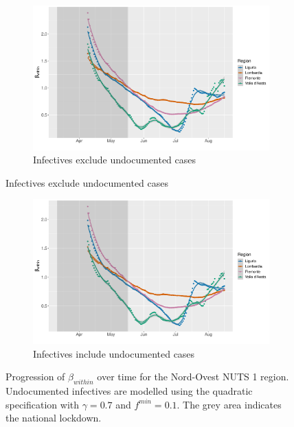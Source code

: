 \documentclass[12pt]{article}
\begin{document}
\begin{appendices}
		\begin{figure}[H]
    	    \centering
    	    \begin{subfigure}{\textwidth}
    	      \centering
    	      \includegraphics[width=0.94\linewidth]{output/model_within_lag14_betawithin_Nord-Ovest_rollingwindow30.pdf}
    	      \caption{Infectives exclude undocumented cases}
    	      \label{fig:beta_within_over_time_northwest_lowsample_regular}
    	    \end{subfigure}
        \end{figure}
        \begin{figure}[H]\ContinuedFloat
    	    \begin{subfigure}{\textwidth}
    	      \centering
    	      \includegraphics[width=0.94\linewidth]{output/model_within_lag14_betawithin_Nord-Ovest_UndocQuadratic_rollingwindow30.pdf}
    	      \caption{Infectives include undocumented cases}
    	      \label{fig:beta_within_over_time_northwest_lowsample_regular_undoc}
    	    \end{subfigure}
    	    \caption{Progression of $\beta_{within}$ over time for the Nord-Ovest NUTS 1 region. Undocumented infectives are modelled using the quadratic specification with $\gamma = 0.7$ and $f^{min}=0.1$. The grey area indicates the national lockdown.}
    	    \label{fig:beta_within_over_time_northwest_lowsample}
    	\end{figure}
		

\end{appendices}
\end{document}
